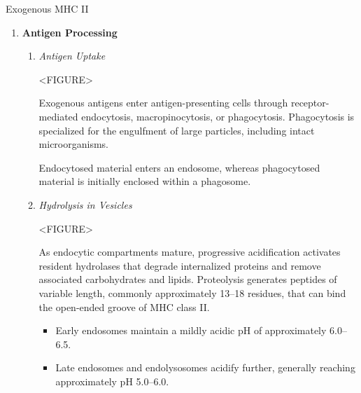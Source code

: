     \begin{core}[label=core:exogenous_mhcii]{Exogenous MHC II}

      \begin{enumerate}[label=(\arabic*)]

        \item \textbf{Antigen Processing}

          \begin{enumerate}

            \item \textit{Antigen Uptake}

              <FIGURE>

              Exogenous antigens enter antigen-presenting cells through receptor-mediated endocytosis, macropinocytosis, or phagocytosis. Phagocytosis is specialized for the engulfment of large particles, including intact microorganisms.

              Endocytosed material enters an endosome, whereas phagocytosed material is initially enclosed within a phagosome.

            \item \textit{Hydrolysis in Vesicles}

              <FIGURE>

              As endocytic compartments mature, progressive acidification activates resident hydrolases that degrade internalized proteins and remove associated carbohydrates and lipids. Proteolysis generates peptides of variable length, commonly approximately 13--18 residues, that can bind the open-ended groove of MHC class II.

              \begin{itemize}

                \item Early endosomes maintain a mildly acidic pH of approximately 6.0--6.5.

                \item Late endosomes and endolysosomes acidify further, generally reaching approximately pH 5.0--6.0.


\end{itemize}
\end{enumerate}
\end{enumerate}
\end{core}
